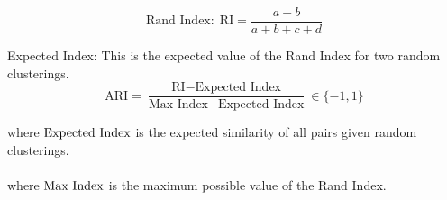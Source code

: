 \documentclass[a4paper,12pt]{article}
\begin{document}
		
		
		\[\text{Rand Index:} \ \ \text{RI} = \frac{a + b}{a + b + c + d} \]
		
		Expected Index: This is the expected value of the Rand Index for two random clusterings.\\
		
		\[ \text{ARI} = \frac{\text{RI} - \text{Expected Index}}{\text{Max Index} - \text{Expected Index}} \in \{-1,1\} \] 
		
		
		where $\bf \text{Expected Index}$ is the expected similarity of all pairs given random clusterings. \\
		\\
		where $\bf \text{Max Index}$ is the maximum possible value of the Rand Index.

	
	

\newpage
\appendix
\end{document}
